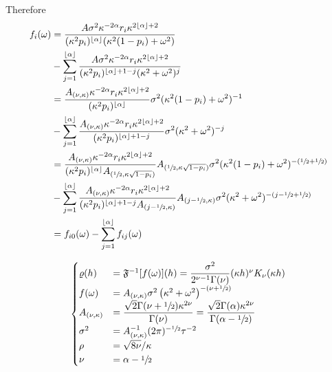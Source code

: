 \documentclass[11pt,a4paper]{article}
\theoremstyle{plain}
\theoremstyle{definition}
\begin{document}
Therefore
\begin{align}
    f_i(\omega) &= \dfrac{A\sigma^2\kappa^{-2\alpha}r_i\kappa^{2\lfloor\alpha\rfloor+2}}{(\kappa^{2}p_i)^{\lfloor\alpha\rfloor}(\kappa^{2}(1-p_i)+\omega^2)}\\
    &- \sum_{j=1}^{\lfloor\alpha\rfloor} \dfrac{A\sigma^2\kappa^{-2\alpha}r_i\kappa^{2\lfloor\alpha\rfloor+2}}{(\kappa^{2}p_i)^{\lfloor\alpha\rfloor+1-j}(\kappa^{2}+\omega^2)^j}\\
    &= \dfrac{A_{(\nu,\kappa)}\kappa^{-2\alpha}r_i\kappa^{2\lfloor\alpha\rfloor+2}}{(\kappa^{2}p_i)^{\lfloor\alpha\rfloor}}\sigma^2(\kappa^{2}(1-p_i)+\omega^2)^{-1}\\
    &- \sum_{j=1}^{\lfloor\alpha\rfloor} \dfrac{A_{(\nu,\kappa)}\kappa^{-2\alpha}r_i\kappa^{2\lfloor\alpha\rfloor+2}}{(\kappa^{2}p_i)^{\lfloor\alpha\rfloor+1-j}}\sigma^2(\kappa^{2}+\omega^2)^{-j}\\
    &= \dfrac{A_{(\nu,\kappa)}\kappa^{-2\alpha}r_i\kappa^{2\lfloor\alpha\rfloor+2}}{(\kappa^{2}p_i)^{\lfloor\alpha\rfloor}A_{(\sfrac{1}{2},\kappa\sqrt{1-p_i})}}A_{(\sfrac{1}{2},\kappa\sqrt{1-p_i})}\sigma^2(\kappa^{2}(1-p_i)+\omega^2)^{-(\sfrac{1}{2}+\sfrac{1}{2})}\\
    &- \sum_{j=1}^{\lfloor\alpha\rfloor} \dfrac{A_{(\nu,\kappa)}\kappa^{-2\alpha}r_i\kappa^{2\lfloor\alpha\rfloor+2}}{(\kappa^{2}p_i)^{\lfloor\alpha\rfloor+1-j}A_{(j-\sfrac{1}{2},\kappa)}}A_{(j-\sfrac{1}{2},\kappa)}\sigma^2(\kappa^{2}+\omega^2)^{-(j-\sfrac{1}{2}+\sfrac{1}{2})}\\
    & = f_{i0}(\omega)- \sum_{j=1}^{\lfloor\alpha\rfloor} f_{ij}(\omega)
\end{align}

\begin{align}
\begin{cases}
    \varrho(h) &= \mathfrak{F}^{-1}[f(\omega)](h)= \dfrac{\sigma^2}{2^{\nu-1}\Gamma(\nu)}(\kappa h)^\nu K_\nu(\kappa h) \\
    f(\omega)& = A_{(\nu,\kappa)}\sigma^2\left(\kappa^2+\omega^2\right)^{-(\nu+\sfrac{1}{2})}\\
    A_{(\nu,\kappa)} & = \dfrac{\sqrt{2}\Gamma(\nu+\sfrac{1}{2})\kappa^{2\nu}}{\Gamma(\nu)} = \dfrac{\sqrt{2}\Gamma(\alpha)\kappa^{2\nu}}{\Gamma(\alpha-\sfrac{1}{2})}\\
    \sigma^2 &= A_{(\nu,\kappa)}^{-1}(2\pi)^{-\sfrac{1}{2}}\tau^{-2}\\
    \rho & = \sqrt{8\nu}/\kappa\\
    \nu &= \alpha-\sfrac{1}{2}
\end{cases}
\end{align}
\end{document}
